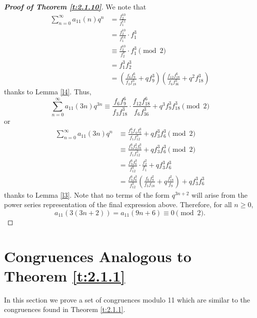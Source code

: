 \documentclass[a4paper,12pt,reqno]{amsart}
\numberwithin{equation}{section}
\begin{document}
\begin{proof}[\it\textbf{Proof of Theorem \ref{t:2.1.10}}]
We note that 
\begin{align*}
\sum_{n=0}^{\infty}a_{11}(n)q^n
&=
\frac{f_2^{10}}{f_1^{11}} \\
&=
\frac{f_2^{10}}{f_1^{14}}\cdot f_1^3 \\
&\equiv 
\frac{f_2^{10}}{f_2^{7}}\cdot f_1^3 \pmod{2}\\
&= 
f_1^3f_2^3  \\
&= 
\left( \frac{f_6f_9^6}{f_3f_{18}^3}+qf_9^3 \right)\left( \frac{f_{12}f_{18}^6}{f_6f_{36}^3}+q^2f_{18}^3 \right) 
\end{align*}
thanks to Lemma \ref{l4}.  
Thus, 
$$
\sum_{n=0}^{\infty}a_{11}(3n)q^{3n} \equiv \frac{f_6f_9^6}{f_3f_{18}^3}\cdot \frac{f_{12}f_{18}^6}{f_6f_{36}^3} +q^3f_9^3f_{18}^3  \pmod{2} 
$$
or 
\begin{align*}
\sum_{n=0}^{\infty}a_{11}(3n)q^{n} 
&\equiv 
\frac{f_3^6f_{4}f_{6}^3}{f_1f_{12}^3} +qf_3^3f_{6}^3  \pmod{2}  \\
&\equiv
\frac{f_3^6f_{2}^2f_{6}^3}{f_1f_{12}^3} +qf_3^3f_{6}^3 \pmod{2} \\
&= 
\frac{f_3^6f_{6}^3}{f_{12}^3}\cdot \frac{f_{2}^2}{f_1} +qf_3^3f_{6}^3 \\
&= 
\frac{f_3^6f_{6}^3}{f_{12}^3} \left( \frac{f_{6} f_{9}^{2}}{f_{3} f_{18}}+q\frac{f_{18}^{2}}{f_9} \right) +qf_3^3f_{6}^3
\end{align*}
thanks to Lemma \ref{l3}.  
Note that no terms of the form $q^{3n+2}$ will arise from the power series representation of the final expression above.  Therefore, for all $n\geq 0$, 
$$
a_{11}(3(3n+2)) = a_{11}(9n+6) \equiv 0 \pmod{2}.
$$
\end{proof}

\section{Congruences Analogous to Theorem \ref{t:2.1.1} }
In this section we prove a set of congruences modulo 11 which are similar to the congruences found in Theorem \ref{t:2.1.1}.
\bigskip
\end{document}
